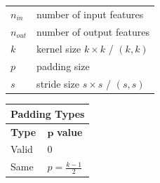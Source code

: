 \begin{table}[h]
    \begin{minipage}[t]{0.5\linewidth}
        \begin{table}[H]
            \begin{tabular}{l l}
                $n_{in}$ & number of input features \\
                $n_{out}$ & number of output features \\
                $k$ & kernel size $k\times k$ / $(k, k)$ \\
                $p$ & padding size \\
                $s$ & stride size $s\times s$ / $(s, s)$ \\
            \end{tabular}
        \end{table}        
    \end{minipage}
    \hfill
    \begin{minipage}[t]{0.5\linewidth}
        \begin{table}[H]
            \begin{tabular}{l|l}
                \multicolumn{2}{c}{Padding Types}\\ \hline
                \textbf{Type} & $\mathbf{p}$ \textbf{value} \\ \hline
                Valid & 0 \\
                Same & \( \displaystyle p = \frac{k - 1}{2} \) \\
                
            \end{tabular}
        \end{table}        
    \end{minipage}
\end{table}







